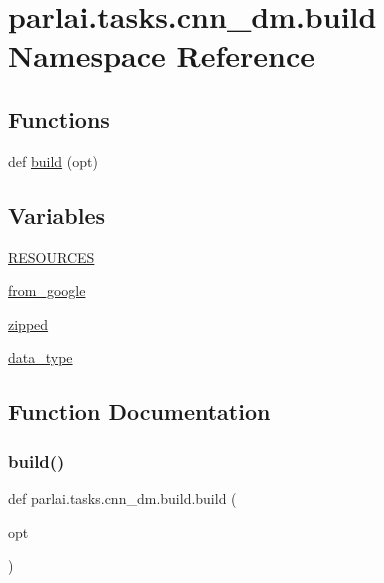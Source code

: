 \hypertarget{namespaceparlai_1_1tasks_1_1cnn__dm_1_1build}{}\section{parlai.\+tasks.\+cnn\+\_\+dm.\+build Namespace Reference}
\label{namespaceparlai_1_1tasks_1_1cnn__dm_1_1build}
\subsection*{Functions}
\begin{DoxyCompactItemize}
\item 
def \hyperlink{namespaceparlai_1_1tasks_1_1cnn__dm_1_1build_ad2c68b11a275c9630ade4d09495b7ece}{build} (opt)
\end{DoxyCompactItemize}
\subsection*{Variables}
\begin{DoxyCompactItemize}
\item 
\hyperlink{namespaceparlai_1_1tasks_1_1cnn__dm_1_1build_a3ddf7d2647df97b847746e19be2b3912}{R\+E\+S\+O\+U\+R\+C\+ES}
\item 
\hyperlink{namespaceparlai_1_1tasks_1_1cnn__dm_1_1build_a0cc36a89771fac81db1aea688dc89a3a}{from\+\_\+google}
\item 
\hyperlink{namespaceparlai_1_1tasks_1_1cnn__dm_1_1build_a166e736167dedb8b8d9fb739629d75fc}{zipped}
\item 
\hyperlink{namespaceparlai_1_1tasks_1_1cnn__dm_1_1build_a1ea50dfc6af9d94313b1d4dffe1fc75f}{data\+\_\+type}
\end{DoxyCompactItemize}


\subsection{Function Documentation}
\mbox{\label{namespaceparlai_1_1tasks_1_1cnn__dm_1_1build_ad2c68b11a275c9630ade4d09495b7ece}} 
\subsubsection{\texorpdfstring{build()}{build()}}
{\footnotesize\ttfamily def parlai.\+tasks.\+cnn\+\_\+dm.\+build.\+build (\begin{DoxyParamCaption}\item[{}]{opt }\end{DoxyParamCaption})}



